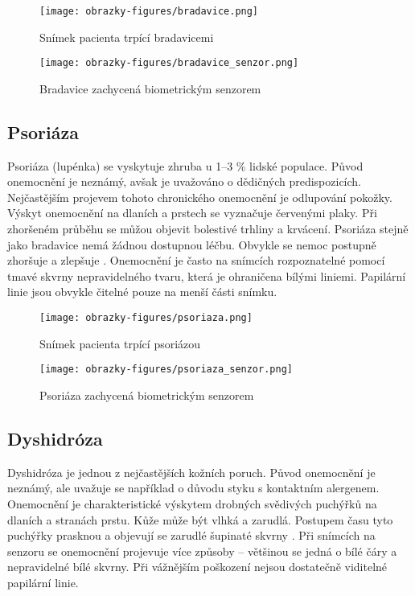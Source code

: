 \begin{figure}[!htbp]
  \begin{minipage}[b]{0.5\linewidth}
    \centering
    \texttt{[image: obrazky-figures/bradavice.png]}
    \caption{Snímek pacienta trpící bradavicemi \cite{InfluenceSkinDiseases}}
  \end{minipage}
  \hspace{0.5cm}
  \begin{minipage}[b]{0.5\linewidth}
    \centering
    \texttt{[image: obrazky-figures/bradavice\_senzor.png]}
    \caption{Bradavice zachycená biometrickým senzorem \cite{Barotova}}
  \end{minipage}
\end{figure}

\subsection*{Psoriáza}
Psoriáza (lupénka) se vyskytuje zhruba u 1--3 \% lidské populace. Původ onemocnění je neznámý, avšak je uvažováno o dědičných predispozicích. Nejčastějším projevem tohoto chronického onemocnění je odlupování pokožky. Výskyt onemocnění na dlaních a prstech se vyznačuje červenými plaky. Při zhoršeném průběhu se můžou objevit bolestivé trhliny a krvácení. Psoriáza stejně jako bradavice nemá žádnou dostupnou léčbu. Obvykle se nemoc postupně zhoršuje a zlepšuje \cite{Psoriasis,InfluenceSkinDiseases}. Onemocnění je často na snímcích rozpoznatelné pomocí tmavé skvrny nepravidelného tvaru, která je ohraničena bílými liniemi. Papilární linie jsou obvykle čitelné pouze na menší části snímku.

\begin{figure}[!htbp]
  \begin{minipage}[b]{0.5\linewidth}
    \centering
    \texttt{[image: obrazky-figures/psoriaza.png]}
    \caption{Snímek pacienta trpící psoriázou~\cite{InfluenceSkinDiseases}}
  \end{minipage}
  \hspace{0.5cm}
  \begin{minipage}[b]{0.5\linewidth}
    \centering
    \texttt{[image: obrazky-figures/psoriaza\_senzor.png]}
    \caption{Psoriáza zachycená biometrickým senzorem \cite{Barotova}}
  \end{minipage}
\end{figure}
\subsection*{Dyshidróza}
Dyshidróza je jednou z nejčastějších kožních poruch. Původ onemocnění je neznámý, ale uvažuje se například o důvodu styku s kontaktním alergenem. Onemocnění je charakteristické výskytem drobných svědivých puchýřků na dlaních a stranách prstu. Kůže může být vlhká a zarudlá. Postupem času tyto puchýřky prasknou a objevují se zarudlé šupinaté skvrny \cite{InfluenceSkinDiseases}. Při snímcích na senzoru se onemocnění projevuje více způsoby -- většinou se jedná o bílé čáry a nepravidelné bílé skvrny. Při vážnějším poškození nejsou dostatečně viditelné papilární linie.

